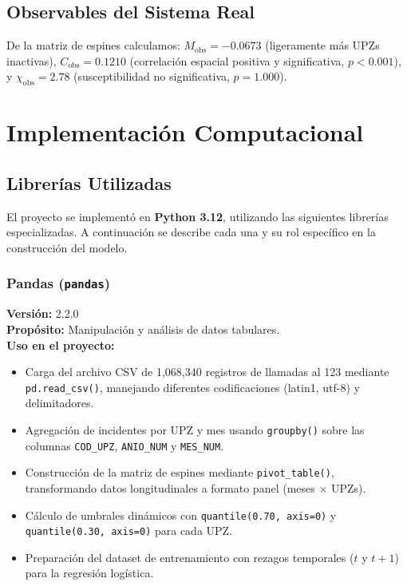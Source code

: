 \documentclass[12pt,a4paper]{article}
\begin{document}
\subsection{Observables del Sistema Real}

De la matriz de espines calculamos: $M_{\text{obs}} = -0.0673$ (ligeramente más UPZs inactivas), $C_{\text{obs}} = 0.1210$ (correlación espacial positiva y significativa, $p < 0.001$), y $\chi_{\text{obs}} = 2.78$ (susceptibilidad no significativa, $p = 1.000$).

\section{Implementación Computacional}

\subsection{Librerías Utilizadas}

El proyecto se implementó en \textbf{Python 3.12}, utilizando las siguientes librerías especializadas. A continuación se describe cada una y su rol específico en la construcción del modelo.

\subsubsection{Pandas (\texttt{pandas})}

\textbf{Versión:} 2.2.0\\
\textbf{Propósito:} Manipulación y análisis de datos tabulares.\\
\textbf{Uso en el proyecto:} 
\begin{itemize}
    \item Carga del archivo CSV de 1,068,340 registros de llamadas al 123 mediante \texttt{pd.read\_csv()}, manejando diferentes codificaciones (latin1, utf-8) y delimitadores.
    \item Agregación de incidentes por UPZ y mes usando \texttt{groupby()} sobre las columnas \texttt{COD\_UPZ}, \texttt{ANIO\_NUM} y \texttt{MES\_NUM}.
    \item Construcción de la matriz de espines mediante \texttt{pivot\_table()}, transformando datos longitudinales a formato panel (meses $\times$ UPZs).
    \item Cálculo de umbrales dinámicos con \texttt{quantile(0.70, axis=0)} y \texttt{quantile(0.30, axis=0)} para cada UPZ.
    \item Preparación del dataset de entrenamiento con rezagos temporales ($t$ y $t+1$) para la regresión logística.
\end{itemize}
\end{document}
